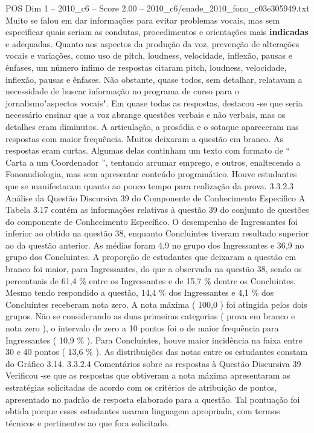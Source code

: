 \begin{textsample}{POS Dim 1 – 2010\_c6 – Score 2.00 – 2010\_c6/enade\_2010\_fono\_c03e305949.txt}
Muito se falou em dar informações para evitar problemas vocais, mas sem especificar quais seriam as condutas, procedimentos e orientações mais \textbf{indicadas} e adequadas.
Quanto aos aspectos da produção da voz, prevenção de alterações vocais e variações, como uso de pitch, loudness, velocidade, inflexão, pausas e ênfases, um número ínfimo de respostas citaram pitch, loudness, velocidade, inflexão, pausas e ênfases.
Não obstante, quase todos, sem detalhar, relatavam a necessidade de buscar informação no programa de curso para o jornalismo"aspectos vocais".
Em quase todas as respostas, destacou -se que seria necessário ensinar que a voz abrange questões verbais e não verbais, mas os detalhes eram diminutos.
A articulação, a prosódia e o sotaque apareceram nas respostas com maior frequência.
Muitos deixaram a questão em branco.
As respostas eram curtas.
Algumas delas continham um texto com formato de “ Carta a um Coordenador ”, tentando arrumar emprego, e outros, enaltecendo a Fonoaudiologia, mas sem apresentar conteúdo programático.
Houve estudantes que se manifestaram quanto ao pouco tempo para realização da prova. 3.3.2.3 Análise da Questão Discursiva 39 do Componente de Conhecimento Específico A Tabela 3.17 contém as informações relativas à questão 39 do conjunto de questões do componente de Conhecimento Específico.
O desempenho de Ingressantes foi inferior ao obtido na questão 38, enquanto Concluintes tiveram resultado superior ao da questão anterior.
As médias foram 4,9 no grupo dos Ingressantes e 36,9 no grupo dos Concluintes.
A proporção de estudantes que deixaram a questão em branco foi maior, para Ingressantes, do que a observada na questão 38, sendo os percentuais de 61,4 \% entre os Ingressantes e de 15,7 \% dentre os Concluintes.
Mesmo tendo respondido a questão, 14,4 \% dos Ingressantes e 4,1 \% dos Concluintes receberam nota zero.
A nota máxima ( 100,0 ) foi atingida pelos dois grupos.
Não se considerando as duas primeiras categorias ( prova em branco e nota zero ), o intervalo de zero a 10 pontos foi o de maior frequência para Ingressantes ( 10,9 \% ).
Para Concluintes, houve maior incidência na faixa entre 30 e 40 pontos ( 13,6 \% ).
As distribuições das notas entre os estudantes constam do Gráfico 3.14. 3.3.2.4 Comentários sobre as respostas à Questão Discursiva 39 Verificou -se que as respostas que obtiveram a nota máxima apresentaram as estratégias solicitadas de acordo com os critérios de atribuição de pontos, apresentado no padrão de resposta elaborado para a questão.
Tal pontuação foi obtida porque esses estudantes usaram linguagem apropriada, com termos técnicos e pertinentes ao que fora solicitado.

\end{textsample}
